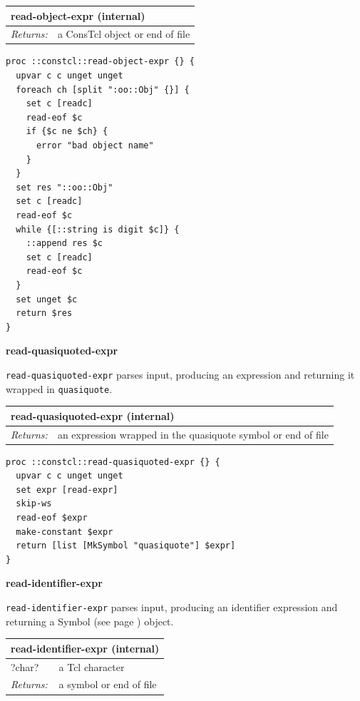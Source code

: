 \documentclass[twoside,9pt]{report}
\begin{document}
\begin{tabular}{ |l l| }
\hline
\multicolumn{2}{|l|}{read-object-expr (internal)} \\
\hline
\textit{Returns:} & a ConsTcl object or end of file \\
\hline
\end{tabular}

\noindent\makebox[\linewidth]{\rule{\linewidth}{0.4pt}}
\begin{lstlisting}
proc ::constcl::read-object-expr {} {
  upvar c c unget unget
  foreach ch [split ":oo::Obj" {}] {
    set c [readc]
    read-eof $c
    if {$c ne $ch} {
      error "bad object name"
    }
  }
  set res "::oo::Obj"
  set c [readc]
  read-eof $c
  while {[::string is digit $c]} {
    ::append res $c
    set c [readc]
    read-eof $c
  }
  set unget $c
  return $res
}
\end{lstlisting}
\noindent\makebox[\linewidth]{\rule{\linewidth}{0.4pt}}

\textbf{read-quasiquoted-expr}


\texttt{read-quasiquoted-expr} parses input, producing an expression and returning it wrapped in \texttt{quasiquote}.

\begin{tabular}{ |l l| }
\hline
\multicolumn{2}{|l|}{read-quasiquoted-expr (internal)} \\
\hline
\textit{Returns:} & an expression wrapped in the quasiquote symbol or end of file \\
\hline
\end{tabular}

\noindent\makebox[\linewidth]{\rule{\linewidth}{0.4pt}}
\begin{lstlisting}
proc ::constcl::read-quasiquoted-expr {} {
  upvar c c unget unget
  set expr [read-expr]
  skip-ws
  read-eof $expr
  make-constant $expr
  return [list [MkSymbol "quasiquote"] $expr]
}
\end{lstlisting}
\noindent\makebox[\linewidth]{\rule{\linewidth}{0.4pt}}

\textbf{read-identifier-expr}


\texttt{read-identifier-expr} parses input, producing an identifier expression and returning a Symbol (see page \pageref{symbols}) object.

\begin{tabular}{ |l l| }
\hline
\multicolumn{2}{|l|}{read-identifier-expr (internal)} \\
\hline
?char? & a Tcl character \\
\textit{Returns:} & a symbol or end of file \\
\hline
\end{tabular}
\end{document}
